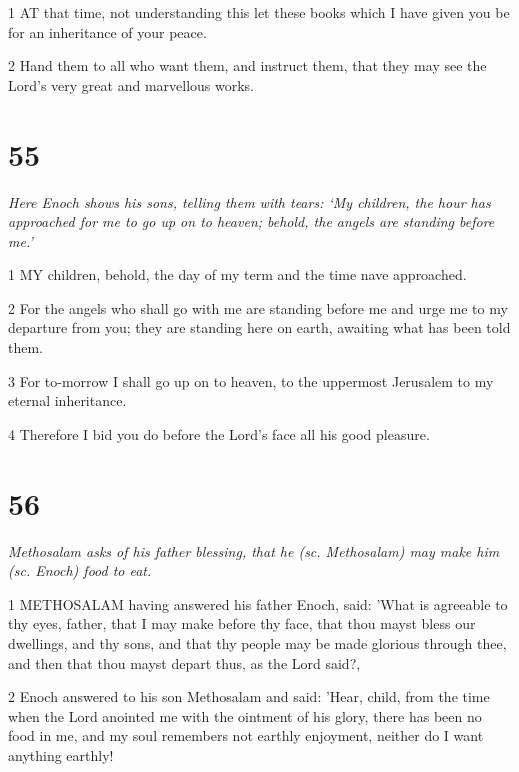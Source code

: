 \par 1 AT that time, not understanding this let these books which I have given you be for an inheritance of your peace.

\par 2 Hand them to all who want them, and instruct them, that they may see the Lord's very great and marvellous works.



\chapter{55}

\par \textit{Here Enoch shows his sons, telling them with tears: ‘My children, the hour has approached for me to go up on to heaven; behold, the angels are standing before me.’}

\par 1 MY children, behold, the day of my term and the time nave approached.

\par 2 For the angels who shall go with me are standing before me and urge me to my departure from you; they are standing here on earth, awaiting what has been told them.

\par 3 For to-morrow I shall go up on to heaven, to the uppermost Jerusalem to my eternal inheritance.

\par 4 Therefore I bid you do before the Lord's face all his good pleasure.

\chapter{56}

\par \textit{Methosalam asks of his father blessing, that he (sc. Methosalam) may make him (sc. Enoch) food to eat.}

\par 1 METHOSALAM having answered his father Enoch, said: 'What is agreeable to thy eyes, father, that I may make before thy face, that thou mayst bless our dwellings, and thy sons, and that thy people may be made glorious through thee, and then that thou mayst depart thus, as the Lord said?,

\par 2 Enoch answered to his son Methosalam and said: 'Hear, child, from the time when the Lord anointed me with the ointment of his glory, there has been no food in me, and my soul remembers not earthly enjoyment, neither do I want anything earthly!

